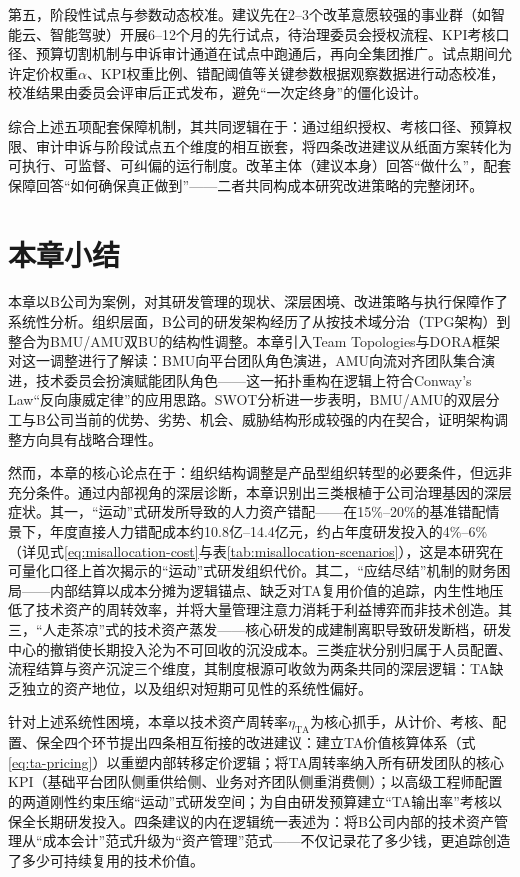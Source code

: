 第五，阶段性试点与参数动态校准。建议先在2--3个改革意愿较强的事业群（如智能云、智能驾驶）开展6--12个月的先行试点，待治理委员会授权流程、KPI考核口径、预算切割机制与申诉审计通道在试点中跑通后，再向全集团推广。试点期间允许定价权重$\alpha$、KPI权重比例、错配阈值等关键参数根据观察数据进行动态校准，校准结果由委员会评审后正式发布，避免“一次定终身”的僵化设计。

综合上述五项配套保障机制，其共同逻辑在于：通过组织授权、考核口径、预算权限、审计申诉与阶段试点五个维度的相互嵌套，将四条改进建议从纸面方案转化为可执行、可监督、可纠偏的运行制度。改革主体（建议本身）回答“做什么”，配套保障回答“如何确保真正做到”——二者共同构成本研究改进策略的完整闭环。

\section{本章小结}

本章以B公司为案例，对其研发管理的现状、深层困境、改进策略与执行保障作了系统性分析。组织层面，B公司的研发架构经历了从按技术域分治（TPG架构）到整合为BMU/AMU双BU的结构性调整。本章引入Team Topologies与DORA框架对这一调整进行了解读：BMU向平台团队角色演进，AMU向流对齐团队集合演进，技术委员会扮演赋能团队角色——这一拓扑重构在逻辑上符合Conway's Law“反向康威定律”的应用思路。SWOT分析进一步表明，BMU/AMU的双层分工与B公司当前的优势、劣势、机会、威胁结构形成较强的内在契合，证明架构调整方向具有战略合理性。

然而，本章的核心论点在于：组织结构调整是产品型组织转型的必要条件，但远非充分条件。通过内部视角的深层诊断，本章识别出三类根植于公司治理基因的深层症状。其一，“运动”式研发所导致的人力资产错配——在15\%--20\%的基准错配情景下，年度直接人力错配成本约10.8亿--14.4亿元，约占年度研发投入的4\%--6\%（详见式\eqref{eq:misallocation-cost}与表\ref{tab:misallocation-scenarios}），这是本研究在可量化口径上首次揭示的“运动”式研发组织代价。其二，“应结尽结”机制的财务困局——内部结算以成本分摊为逻辑锚点、缺乏对TA复用价值的追踪，内生性地压低了技术资产的周转效率，并将大量管理注意力消耗于利益博弈而非技术创造。其三，“人走茶凉”式的技术资产蒸发——核心研发的成建制离职导致研发断档，研发中心的撤销使长期投入沦为不可回收的沉没成本。三类症状分别归属于人员配置、流程结算与资产沉淀三个维度，其制度根源可收敛为两条共同的深层逻辑：TA缺乏独立的资产地位，以及组织对短期可见性的系统性偏好。

针对上述系统性困境，本章以技术资产周转率$\eta_{\mathrm{TA}}$为核心抓手，从计价、考核、配置、保全四个环节提出四条相互衔接的改进建议：建立TA价值核算体系（式\eqref{eq:ta-pricing}）以重塑内部转移定价逻辑；将TA周转率纳入所有研发团队的核心KPI（基础平台团队侧重供给侧、业务对齐团队侧重消费侧）；以高级工程师配置的两道刚性约束压缩“运动”式研发空间；为自由研发预算建立“TA输出率”考核以保全长期研发投入。四条建议的内在逻辑统一表述为：将B公司内部的技术资产管理从“成本会计”范式升级为“资产管理”范式——不仅记录花了多少钱，更追踪创造了多少可持续复用的技术价值。

